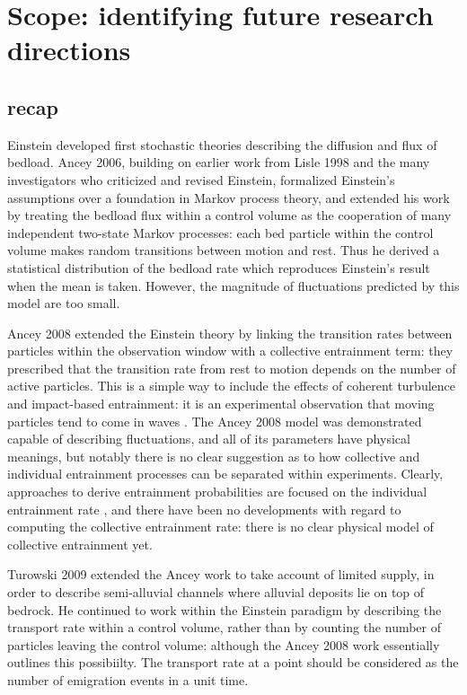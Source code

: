\section{Scope: identifying future research directions}
\label{sec:scope}







\subsection{recap} 
Einstein developed first stochastic theories describing the diffusion and flux of bedload. 
Ancey 2006, building on earlier work from Lisle 1998 and the many investigators who criticized and revised Einstein, formalized Einstein's assumptions over a foundation in Markov process theory, and extended his work by treating the bedload flux within a control volume as the cooperation of many independent two-state Markov processes: each bed particle within the control volume makes random transitions between motion and rest. 
Thus he derived a statistical distribution of the bedload rate which reproduces Einstein's result when the mean is taken. 
However, the magnitude of fluctuations predicted by this model are too small. 

Ancey 2008 extended the Einstein theory by linking the transition rates between particles within the observation window with a collective entrainment term: they prescribed that the transition rate from rest to motion depends on the number of active particles. 
This is a simple way to include the effects of coherent turbulence and impact-based entrainment: it is an experimental observation that moving particles tend to come in waves \citep{Drake1988}. 
The Ancey 2008 model was demonstrated capable of describing fluctuations, and all of its parameters have physical meanings, but notably there is no clear suggestion as to how collective and individual entrainment processes can be separated within experiments. 
Clearly, approaches to derive entrainment probabilities are focused on the individual entrainment rate \citep{Dey2018}, and there have been no developments with regard to computing the collective entrainment rate: there is no clear physical model of collective entrainment yet. 

Turowski 2009 extended the Ancey work to take account of limited supply, in order to describe semi-alluvial channels where alluvial deposits lie on top of bedrock. 
He continued to work within the Einstein paradigm by describing the transport rate within a control volume, rather than by counting the number of particles leaving the control volume: although the Ancey 2008 work essentially outlines this possibiilty. The transport rate at a point should be considered as the number of emigration events in a unit time. 

